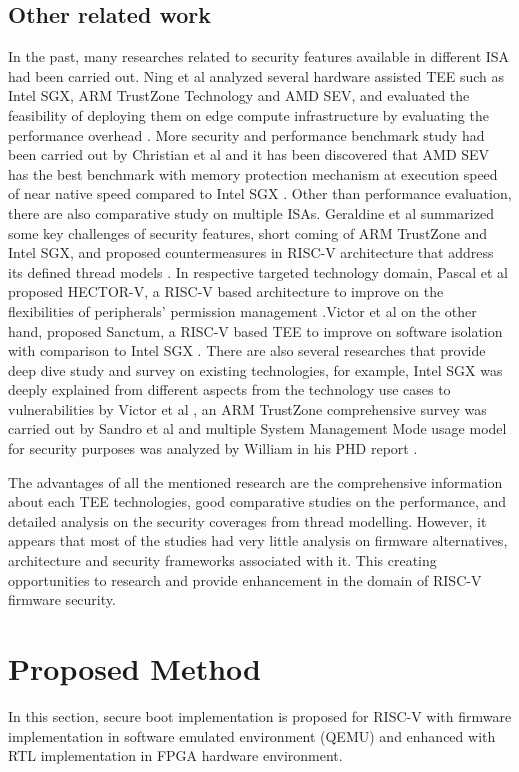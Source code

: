 \documentclass[review]{elsarticle}
\begin{document}
\subsection{ Other related work}
In the past, many researches related to security features available in different ISA had been carried out.
Ning et al analyzed several hardware assisted TEE such as Intel SGX, ARM TrustZone Technology
and AMD SEV, and evaluated the feasibility of deploying them on edge compute infrastructure by evaluating the performance overhead \cite{R5:2}.
More security and performance benchmark study had been carried out by Christian et al and it has been discovered that AMD SEV has the best benchmark with memory protection mechanism at execution speed of near native speed compared to Intel SGX \cite{R5:3}.
Other than performance evaluation, there are also comparative study on multiple ISAs. Geraldine et
al summarized some key challenges of security features, short coming of ARM TrustZone and Intel SGX, and proposed countermeasures in RISC-V architecture that address its defined thread models \cite{R5:4}.
In respective targeted technology domain, Pascal et al proposed HECTOR-V, a RISC-V based architecture to improve on the flexibilities of peripherals’ permission management \cite{R5:5}.Victor et al on the other hand, proposed Sanctum, a RISC-V based TEE to improve on software isolation with comparison to Intel SGX \cite{R5:6}. There are also several researches that provide deep dive study and survey on existing technologies, for example, Intel SGX was deeply explained from different aspects from the technology use cases to vulnerabilities by Victor et al \cite{R5:7}, an ARM TrustZone comprehensive survey was carried out by Sandro et al \cite{R5:8} and multiple System Management Mode usage model for security purposes was analyzed by William in his PHD report \cite{R5:9}.

The advantages of all the mentioned research are the comprehensive information about each TEE technologies, good comparative studies on the performance, and detailed analysis on the security coverages from thread modelling. However, it appears that most of the studies had very little analysis on firmware alternatives, architecture and security frameworks associated with it. This creating opportunities to research and provide enhancement in the domain of RISC-V firmware security.

\section{ Proposed Method}
In this section, secure boot implementation is proposed for RISC-V with firmware implementation in software emulated environment (QEMU) and enhanced with RTL implementation in FPGA hardware environment.
\end{document}
